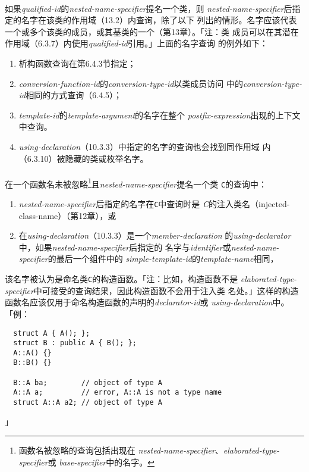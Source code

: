 \paragraph{}
如果\textit{qualified-id}的\textit{nested-name-specifier}提名一个类，则
\textit{nested-name-specifier}后指定的名字在该类的作用域（13.2）内查询，除了以下
列出的情形。名字应该代表一个或多个该类的成员，或其基类的一个（第13章）。「注：类
成员可以在其潜在作用域（6.3.7）内使用\textit{qualified-id}引用。」上面的名字查询
的例外如下：
\begin{enumerate}
  \item{析构函数查询在第6.4.3节指定；}
  \item{\textit{conversion-function-id}的\textit{conversion-type-id}以类成员访问
    中的\textit{conversion-type-id}相同的方式查询（6.4.5）；}
  \item{\textit{template-id}的\textit{template-argument}的名字在整个
    \textit{postfix-expression}出现的上下文中查询。}
  \item{\textit{using-declaration}（10.3.3）中指定的名字的查询也会找到同作用域
    内（6.3.10）被隐藏的类或枚举名字。}
\end{enumerate}

\paragraph{}
在一个函数名未被忽略\footnote{函数名被忽略的查询包括出现在
\textit{nested-name-specifier}、\textit{elaborated-type-specifier}或
\textit{base-specifier}中的名字。}且\textit{nested-name-specifier}提名一个类
\texttt{C}的查询中：
\begin{enumerate}
  \item{\textit{nested-name-specifier}后指定的名字在\texttt{C}中查询时是
    \textit{C}的注入类名（injected-class-name）（第12章），或}
  \item{在\textit{using-declaration}（10.3.3）是一个\textit{member-declaration}
    的\textit{using-declarator}中，如果\textit{nested-name-specifier}后指定的
    名字与\textit{identifier}或\textit{nested-name-specifier}的最后一个组件中的
    \textit{simple-template-id}的\textit{template-name}相同，}
\end{enumerate}
该名字被认为是命名类\texttt{C}的构造函数。「注：比如，构造函数不是
\textit{elaborated-type-specifier}中可接受的查询结果，因此构造函数不会用于注入类
名处。」这样的构造函数名应该仅用于命名构造函数的声明的\textit{declarator-id}或
\textit{using-declaration}中。「例：
\begin{lstlisting}
  struct A { A(); };
  struct B : public A { B(); };
  A::A() {}
  B::B() {}

  B::A ba;        // object of type A
  A::A a;         // error, A::A is not a type name
  struct A::A a2; // object of type A
\end{lstlisting}」

